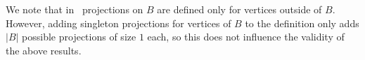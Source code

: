 %

We note that in~\cite{drange2016kernelization,eickmeyer2016neighborhood} projections on $B$ are defined only for vertices outside of $B$. 
However, adding singleton projections for vertices of $B$ to the definition only adds $|B|$ possible projections of size $1$ each, so this does not influence the validity of the above results.


